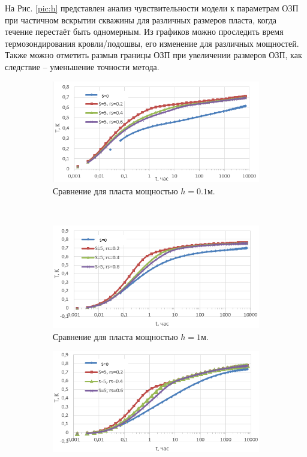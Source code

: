 	На Рис. \ref{pic:h} представлен анализ чувствительности модели к параметрам ОЗП при частичном вскрытии скважины для различных размеров пласта, когда течение перестаёт быть одномерным.
	Из графиков можно проследить время термозондирования кровли/подошвы, его изменение для различных мощностей. Также можно отметить размыв границы ОЗП при увеличении размеров ОЗП, как следствие -- уменьшение точности метода.
\begin{figure}[H]
	\begin{subfigure}[b]{0.5\textwidth}
	\centering
	\includegraphics[width=1\textwidth]{pic/h01.png}
	\caption{Сравнение для пласта мощностью $h=0.1\text{м}$.}
	\label{pic:h01}
	\end{subfigure}
~
	\begin{subfigure}[b]{0.5\textwidth}
		\centering
		\includegraphics[width=1\textwidth]{pic/h1.png}
	\caption{Сравнение для пласта мощностью $h=1\text{м}$.}
	\label{pic:h1}
	\end{subfigure}
	\begin{subfigure}[b]{0.5\textwidth}
		\centering
		\includegraphics[width=1\textwidth]{pic/h10.png}

\end{subfigure}
\end{figure}

